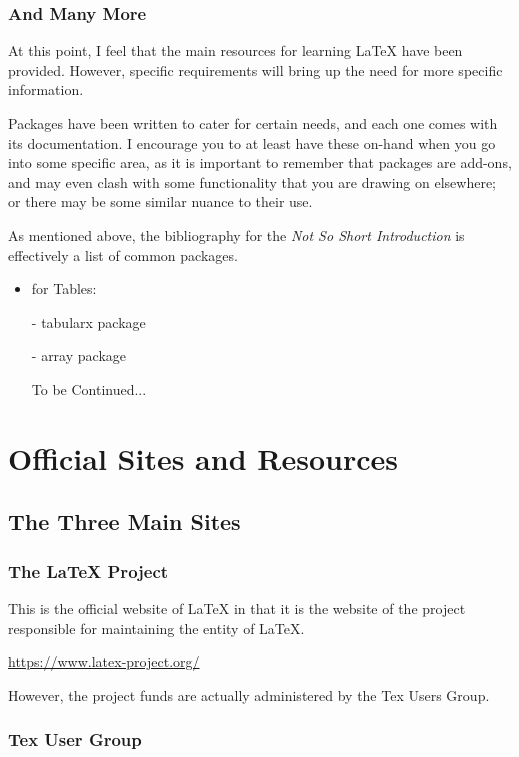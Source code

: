 \documentclass[11pt, oneside]{memoir}
\begin{document}
\subsection{And Many More}
At this point, I feel that the main resources for learning LaTeX have been provided. However, specific requirements will bring up the need for more specific information. 

Packages have been written to cater for certain needs, and each one comes with its documentation. I encourage you to at least have these on-hand when you go into some specific area, as it is important to remember that packages are add-ons, and may even clash with some functionality that you are drawing on elsewhere; or there may be some similar nuance to their use.

As mentioned above, the bibliography for the \emph{Not So Short Introduction} is effectively a list of common packages.

\begin{itemize}
    \item for Tables:
    \item[-] tabularx package
    \item[-] array package
    \item[] To be Continued...
\end{itemize}

\chapter{Official Sites and Resources}

\section{The Three Main Sites}
\subsection{The LaTeX Project}

This is the official website of LaTeX in that it is the website of the project responsible for maintaining the entity of LaTeX.

\url{https://www.latex-project.org/}

However, the project funds are actually administered by the Tex Users Group.

\subsection{Tex User Group}
\end{document}
